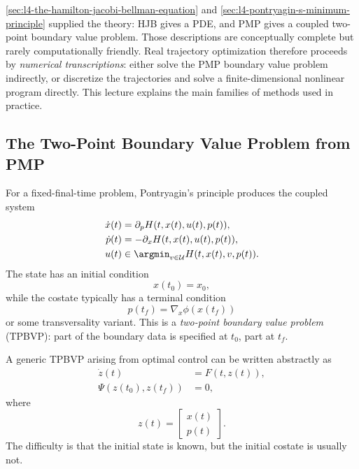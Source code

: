 \label{lec:l5}

\begin{intuition}
	\autoref{sec:l4-the-hamilton-jacobi-bellman-equation} and \autoref{sec:l4-pontryagin-s-minimum-principle} supplied the theory: HJB gives a PDE, and PMP gives a coupled two-point boundary value problem. Those descriptions are conceptually complete but rarely computationally friendly. Real trajectory optimization therefore proceeds by \emph{numerical transcriptions}: either solve the PMP boundary value problem indirectly, or discretize the trajectories and solve a finite-dimensional nonlinear program directly. This lecture explains the main families of methods used in practice.
\end{intuition}

\subsection{The Two-Point Boundary Value Problem from PMP}
\label{sec:l5-the-two-point-boundary-value-problem-from-pmp}

\begin{remark}
	For a fixed-final-time problem, Pontryagin's principle produces the coupled system
	\begin{align*}
		\dot x(t) & = \partial_p H(t,x(t),u(t),p(t)), \\
		\dot p(t) & = -\partial_x H(t,x(t),u(t),p(t)), \\
		u(t) & \in \argmin_{v \in \mathcal{U}} H(t,x(t),v,p(t)).
	\end{align*}
	The state has an initial condition
	\[
		x(t_0)=x_0,
	\]
	while the costate typically has a terminal condition
	\[
		p(t_f)=\nabla_x \phi(x(t_f))
	\]
	or some transversality variant. This is a \emph{two-point boundary value problem} (TPBVP): part of the boundary data is specified at $t_0$, part at $t_f$.
\end{remark}

\begin{definition}\label{def:l5-tpbvp-structure}
	A generic TPBVP arising from optimal control can be written abstractly as
	\begin{align*}
		\dot z(t) & = F(t,z(t)), \\
		\Psi(z(t_0),z(t_f)) & = 0,
	\end{align*}
	where
	\[
		z(t)=\begin{bmatrix}x(t) \\ p(t)\end{bmatrix}.
	\]
	The difficulty is that the initial state is known, but the initial costate is usually not.
\end{definition}

